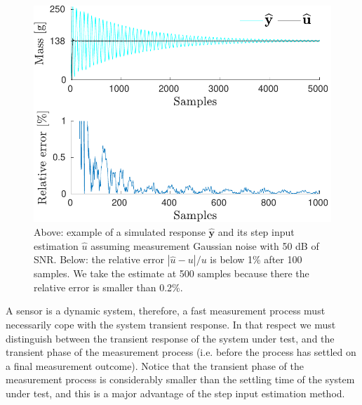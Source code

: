\begin{figure}[!htb]
\centering
\includegraphics[width=1.0\columnwidth]{./ChapterExperimentalValidation/fig/Fig_1.pdf} 
\caption{ \label{fig:uh_sim} 
Above: example of a simulated response $\widehat{\mathbf{y}}$ and its step input estimation $\widehat{u}$ assuming measurement Gaussian noise with 50 dB of SNR. 
Below: the relative error $|\widehat{u} - u| / u$ is below 1\% after 100 samples. 
We take the estimate at 500 samples because there the relative error is smaller than 0.2\%.  }
\end{figure}

A sensor is a dynamic system, therefore, a fast measurement process must necessarily cope with the system transient response. In that respect we must distinguish between the transient response of the system under test, and the transient phase of the measurement process (i.e. before the process has settled on a final measurement outcome). Notice that the transient phase of the measurement process is considerably smaller than the settling time of the system under test, and this is a major advantage of the step input estimation method.

